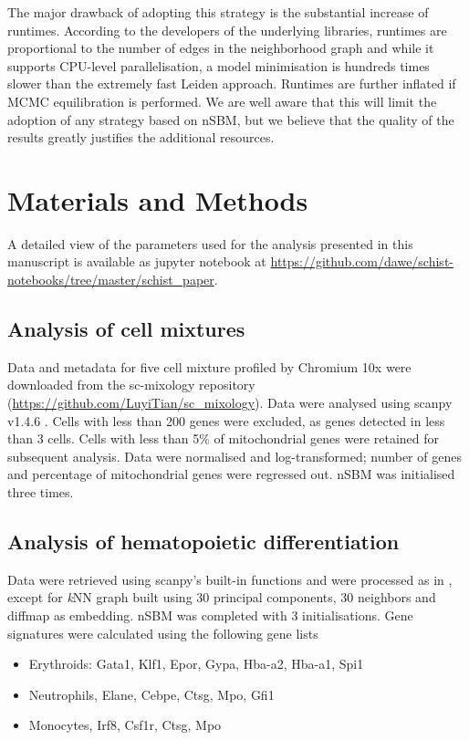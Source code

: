 \documentclass{bmcart}
\begin{document}
The major drawback of adopting this strategy is the substantial increase of runtimes. According to the developers of the underlying libraries, runtimes are proportional to the number of edges in the neighborhood graph and while it supports CPU-level parallelisation, a model minimisation is hundreds times slower than  the extremely fast Leiden approach. Runtimes are further inflated if MCMC equilibration is performed. We are well aware that this will limit the adoption of any strategy based on nSBM, but we believe that the quality of the results greatly justifies the additional resources.


\section*{Materials and Methods}

A detailed view of the parameters used for the analysis presented in this manuscript is available as jupyter notebook at \href{https://github.com/dawe/schist-notebooks/tree/master/schist_paper}{https:/\slash github.com\slash dawe\slash schist-notebooks\slash tree\slash master\slash schist\_paper}.

\subsection*{Analysis of cell mixtures}

Data and metadata for five cell mixture profiled by Chromium 10x were downloaded from the sc-mixology repository (\href{https://github.com/LuyiTian/sc_mixology}{https:/\slash github.com\slash LuyiTian\slash sc\_mixology}). Data were analysed using scanpy v1.4.6 \cite{wolf_2018}. Cells with less than 200 genes were excluded, as genes detected in less than 3 cells. Cells with less than 5\% of mitochondrial genes were retained for subsequent analysis. Data were normalised and log-transformed; number of genes and percentage of mitochondrial genes were regressed out. nSBM was initialised three times.

\subsection*{Analysis of hematopoietic differentiation}

Data were retrieved using scanpy's built-in functions and were processed as in \cite{wolf_2019}, except for \emph{k}NN graph built using 30 principal components, 30 neighbors and diffmap as embedding. nSBM was completed with 3 initialisations. Gene signatures were calculated using the following gene lists
\begin{itemize}
\item Erythroids: Gata1, Klf1, Epor, Gypa, Hba-a2, Hba-a1, Spi1
\item Neutrophils, Elane, Cebpe, Ctsg, Mpo, Gfi1
\item Monocytes, Irf8, Csf1r, Ctsg, Mpo
\end{itemize}
\end{document}
